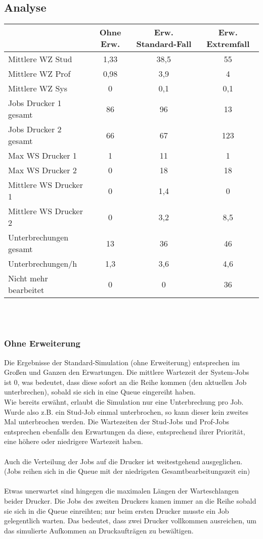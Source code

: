 \documentclass[12pt,a4paper]{article}
\begin{document}
	\subsection{Analyse}
	\begin{tabular}{|l|c|c|c|}
		\hline  & Ohne Erw. & Erw. Standard-Fall & Erw. Extremfall \\
		\hline Mittlere WZ Stud 	   & 1,33 & 38,5 & 55 \\ 
		\hline Mittlere WZ Prof 	   & 0,98 & 3,9 & 4 \\ 
		\hline Mittlere WZ Sys 		   & 0 & 0,1 & 0,1 \\ 
		\hline Jobs Drucker 1 gesamt   & 86 & 96 & 13 \\ 
		\hline Jobs Drucker 2 gesamt   & 66 & 67 & 123 \\ 
		\hline Max WS Drucker 1 	   & 1 & 11 & 1 \\ 
		\hline Max WS Drucker 2 	   & 0 & 18 & 18 \\ 
		\hline Mittlere WS Drucker 1   & 0 & 1,4 & 0 \\ 
		\hline Mittlere WS Drucker 2   & 0 & 3,2 & 8,5 \\
		\hline Unterbrechungen gesamt  & 13 & 36 & 46 \\  
		\hline Unterbrechungen/h 	   & 1,3 & 3,6 & 4,6 \\ 
		\hline Nicht mehr bearbeitet   & 0 & 0 & 36 \\
		\hline 
	\end{tabular}
	\\	
	\\
	\subsubsection{Ohne Erweiterung}
	Die Ergebnisse der Standard-Simulation (ohne Erweiterung) entsprechen im Großen und Ganzen den Erwartungen. Die mittlere Wartezeit der System-Jobs ist 0, was bedeutet, dass diese sofort an die Reihe 
	kommen (den aktuellen Job unterbrechen), sobald sie sich in eine Queue eingereiht haben. \\
	Wie bereits erwähnt, erlaubt die Simulation nur eine Unterbrechung pro Job. Wurde also z.B. ein Stud-Job einmal unterbrochen, so kann dieser kein zweites Mal unterbrochen werden.
	Die Wartezeiten der Stud-Jobs und Prof-Jobs entsprechen ebenfalls den Erwartungen da diese, entsprechend ihrer Priorität, eine höhere oder niedrigere Wartezeit haben.\\
	\\
	Auch die Verteilung der Jobs auf die Drucker ist weitestgehend ausgeglichen.
	(Jobs reihen sich in die Queue mit der niedrigsten Gesamtbearbeitungszeit ein)\\
	\\
	Etwas unerwartet sind hingegen die maximalen Längen der Warteschlangen beider Drucker. Die Jobs des zweiten Druckers kamen immer an die Reihe sobald sie sich in die Queue einreihten; nur beim
	ersten Drucker musste ein Job gelegentlich warten. Das bedeutet, dass zwei Drucker vollkommen ausreichen, um das simulierte Aufkommen an Druckaufträgen zu bewältigen.\\
	
\end{document}
